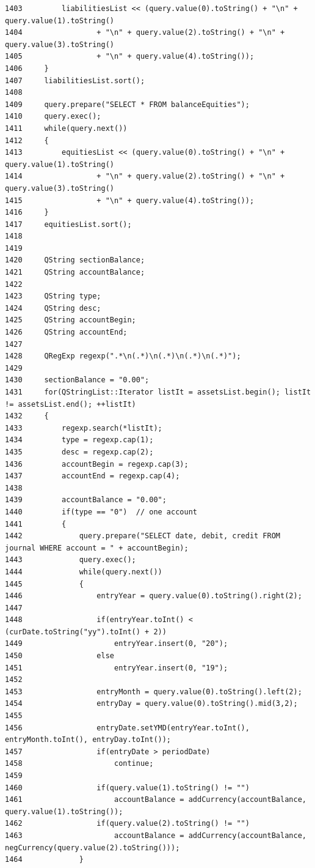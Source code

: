 \begin{verbatim}
1403         liabilitiesList << (query.value(0).toString() + "\n" + query.value(1).toString()
1404                 + "\n" + query.value(2).toString() + "\n" + query.value(3).toString()
1405                 + "\n" + query.value(4).toString());
1406     }
1407     liabilitiesList.sort();
1408 
1409     query.prepare("SELECT * FROM balanceEquities");
1410     query.exec();
1411     while(query.next())
1412     {
1413         equitiesList << (query.value(0).toString() + "\n" + query.value(1).toString()
1414                 + "\n" + query.value(2).toString() + "\n" + query.value(3).toString()
1415                 + "\n" + query.value(4).toString());
1416     }
1417     equitiesList.sort();
1418 
1419 
1420     QString sectionBalance;
1421     QString accountBalance;
1422 
1423     QString type;
1424     QString desc;
1425     QString accountBegin;
1426     QString accountEnd;
1427     
1428     QRegExp regexp(".*\n(.*)\n(.*)\n(.*)\n(.*)");
1429 
1430     sectionBalance = "0.00";
1431     for(QStringList::Iterator listIt = assetsList.begin(); listIt != assetsList.end(); ++listIt)
1432     {
1433         regexp.search(*listIt);
1434         type = regexp.cap(1);
1435         desc = regexp.cap(2);
1436         accountBegin = regexp.cap(3);
1437         accountEnd = regexp.cap(4);
1438 
1439         accountBalance = "0.00";
1440         if(type == "0")  // one account
1441         {
1442             query.prepare("SELECT date, debit, credit FROM journal WHERE account = " + accountBegin);
1443             query.exec();
1444             while(query.next())
1445             {
1446                 entryYear = query.value(0).toString().right(2);
1447                 
1448                 if(entryYear.toInt() < (curDate.toString("yy").toInt() + 2))
1449                     entryYear.insert(0, "20");
1450                 else
1451                     entryYear.insert(0, "19");
1452                 
1453                 entryMonth = query.value(0).toString().left(2);
1454                 entryDay = query.value(0).toString().mid(3,2);
1455                 
1456                 entryDate.setYMD(entryYear.toInt(), entryMonth.toInt(), entryDay.toInt());
1457                 if(entryDate > periodDate)
1458                     continue;
1459 
1460                 if(query.value(1).toString() != "")
1461                     accountBalance = addCurrency(accountBalance, query.value(1).toString());
1462                 if(query.value(2).toString() != "")
1463                     accountBalance = addCurrency(accountBalance, negCurrency(query.value(2).toString()));
1464             }

\end{verbatim}
